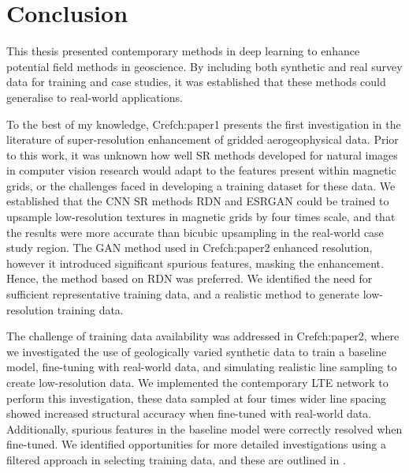 \documentclass[manuscript.tex]{subfiles}
\begin{document}
\chapter{Conclusion}
This thesis presented contemporary methods in deep learning to enhance potential field methods in geoscience.
By including both synthetic and real survey data for training and case studies, it was established that these methods could generalise to real-world applications.

To the best of my knowledge, Cref{ch:paper1} presents the first investigation in the literature of super-resolution enhancement of gridded aerogeophysical data.
Prior to this work, it was unknown how well SR methods developed for natural images in computer vision research would adapt to the features present within magnetic grids, or the challenges faced in developing a training dataset for these data.
We established that the CNN SR methods RDN and ESRGAN could be trained to upsample low-resolution textures in magnetic grids by four times scale, and that the results were more accurate than bicubic upsampling in the real-world case study region.
The GAN method used in Cref{ch:paper2} enhanced resolution, however it introduced significant spurious features, masking the enhancement.
Hence, the method based on RDN was preferred.
We identified the need for sufficient representative training data, and a realistic method to generate low-resolution training data.

The challenge of training data availability was addressed in Cref{ch:paper2}, where we investigated the use of geologically varied synthetic data to train a baseline model, fine-tuning with real-world data, and simulating realistic line sampling to create low-resolution data.
We implemented the contemporary LTE network to perform this investigation, these data sampled at four times wider line spacing showed increased structural accuracy when fine-tuned with real-world data.
Additionally, spurious features in the baseline model were correctly resolved when fine-tuned.
We identified opportunities for more detailed investigations using a filtered approach in selecting training data, and these are outlined in .
\end{document}
